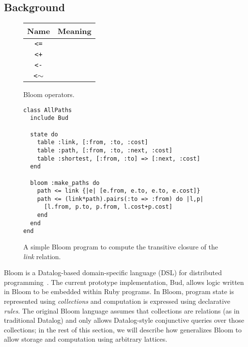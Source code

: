 \section{\lang}

\subsection{Background}
\begin{figure}
\begin{tabular}{|c|l|}
\hline
Name & Meaning \\
\hline
\verb|<=| &  \\
\hline
\verb|<+| &  \\
\hline
\verb|<-| &  \\
\hline
\verb|<|$\sim$ &  \\
\hline
\end{tabular}
\caption{Bloom operators.}
\label{fig:bloom-ops}
\end{figure}

\begin{figure}[t]
\begin{scriptsize}
\begin{lstlisting}
class AllPaths
  include Bud

  state do
    table :link, [:from, :to, :cost]
    table :path, [:from, :to, :next, :cost]
    table :shortest, [:from, :to] => [:next, :cost]
  end

  bloom :make_paths do
    path <= link {|e| [e.from, e.to, e.to, e.cost]}
    path <= (link*path).pairs(:to => :from) do |l,p|
      [l.from, p.to, p.from, l.cost+p.cost]
    end
  end
end
\end{lstlisting}
\end{scriptsize}
\caption{A simple Bloom program to compute the transitive closure of the
  \emph{link} relation.}
\label{fig:bloom-spaths}
\end{figure}

Bloom is a Datalog-based domain-specific language (DSL) for distributed
programming~\cite{Alvaro2011,bloom}. The current prototype implementation, Bud,
allows logic written in Bloom to be embedded within Ruby programs. In Bloom,
program state is represented using \emph{collections} and computation is
expressed using declarative \emph{rules}. The original Bloom language assumes
that collections are relations (as in traditional Datalog) and only allows
Datalog-style conjunctive queries over those collections; in the rest of this
section, we will describe how \lang generalizes Bloom to allow storage and
computation using arbitrary lattices.

